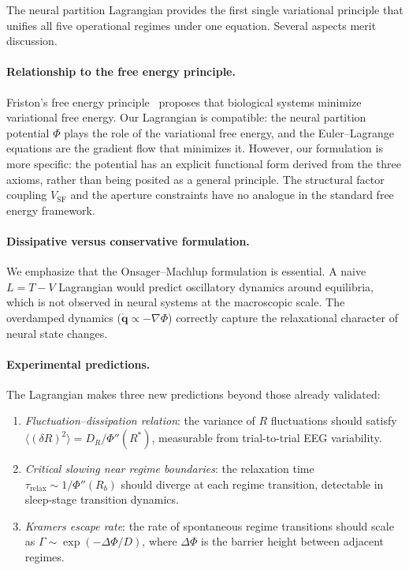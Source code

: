 \documentclass[twocolumn,aps,prl,superscriptaddress,floatfix]{revtex4-2}
\newcommand{\Pot}{\Phi}
\newcommand{\qvec}{\mathbf{q}}
\begin{document}
The neural partition Lagrangian provides the first single variational principle that unifies all five operational regimes under one equation.
Several aspects merit discussion.

\paragraph{Relationship to the free energy principle.}
Friston's free energy principle~\cite{friston2006,friston2010} proposes that biological systems minimize variational free energy.
Our Lagrangian is compatible: the neural partition potential $\Pot$ plays the role of the variational free energy, and the Euler--Lagrange equations are the gradient flow that minimizes it.
However, our formulation is more specific: the potential has an explicit functional form derived from the three axioms, rather than being posited as a general principle.
The structural factor coupling $V_{\mathrm{SF}}$ and the aperture constraints have no analogue in the standard free energy framework.

\paragraph{Dissipative versus conservative formulation.}
We emphasize that the Onsager--Machlup formulation is essential.
A naive $L = T - V$ Lagrangian would predict oscillatory dynamics around equilibria, which is not observed in neural systems at the macroscopic scale.
The overdamped dynamics ($\dot{\qvec} \propto -\nabla\Pot$) correctly capture the relaxational character of neural state changes.

\paragraph{Experimental predictions.}
The Lagrangian makes three new predictions beyond those already validated:
\begin{enumerate}
    \item \emph{Fluctuation--dissipation relation}: the variance of $R$ fluctuations should satisfy $\langle(\delta R)^2\rangle = D_R / \Pot''(R^*)$, measurable from trial-to-trial EEG variability.
    \item \emph{Critical slowing near regime boundaries}: the relaxation time $\tau_{\mathrm{relax}} \sim 1/\Pot''(R_b)$ should diverge at each regime transition, detectable in sleep-stage transition dynamics.
    \item \emph{Kramers escape rate}: the rate of spontaneous regime transitions should scale as $\Gamma \sim \exp(-\Delta\Pot / D)$, where $\Delta\Pot$ is the barrier height between adjacent regimes.
\end{enumerate}
\end{document}
